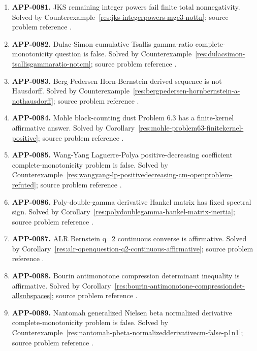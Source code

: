 \documentclass[11pt]{article}
\numberwithin{equation}{section}
\theoremstyle{definition}
\theoremstyle{remark}
\newcommand{\1}{\mathbf 1}
\begin{document}
\begin{enumerate}
\item \label{ledger:app-0081}\textbf{APP-0081.} JKS remaining integer powers fail finite total nonnegativity. Solved by Counterexample~\ref{res:jks-integerpowers-mge3-nottn}; source problem reference \cite{app-app-0065-source}.
\item \label{ledger:app-0082}\textbf{APP-0082.} Dulac-Simon cumulative Tsallis gamma-ratio complete-monotonicity question is false. Solved by Counterexample~\ref{res:dulacsimon-tsallisgammaratio-notcm}; source problem reference \cite{app-app-0082-source}.
\item \label{ledger:app-0083}\textbf{APP-0083.} Berg-Pedersen Horn-Bernstein derived sequence is not Hausdorff. Solved by Counterexample~\ref{res:bergpedersen-hornbernstein-a-nothausdorff}; source problem reference \cite{app-app-0083-source}.
\item \label{ledger:app-0084}\textbf{APP-0084.} Mohle block-counting dust Problem 6.3 has a finite-kernel affirmative answer. Solved by Corollary~\ref{res:mohle-problem63-finitekernel-positive}; source problem reference \cite{app-app-0084-source}.
\item \label{ledger:app-0085}\textbf{APP-0085.} Wang-Yang Laguerre-Polya positive-decreasing coefficient complete-monotonicity problem is false. Solved by Counterexample~\ref{res:wangyang-lp-positivedecreasing-cm-openproblem-refuted}; source problem reference \cite{app-app-0085-source}.
\item \label{ledger:app-0086}\textbf{APP-0086.} Poly-double-gamma derivative Hankel matrix has fixed spectral sign. Solved by Corollary~\ref{res:polydoublegamma-hankel-matrix-inertia}; source problem reference \cite{app-app-0086-source}.
\item \label{ledger:app-0087}\textbf{APP-0087.} ALR Bernstein q=2 continuous converse is affirmative. Solved by Corollary~\ref{res:alr-openquestion-q2-continuous-affirmative}; source problem reference \cite{app-app-0087-source}.
\item \label{ledger:app-0088}\textbf{APP-0088.} Bourin antimonotone compression determinant inequality is affirmative. Solved by Corollary~\ref{res:bourin-antimonotone-compressiondet-allsubspaces}; source problem reference \cite{app-app-0088-source}.
\item \label{ledger:app-0089}\textbf{APP-0089.} Nantomah generalized Nielsen beta normalized derivative complete-monotonicity problem is false. Solved by Counterexample~\ref{res:nantomah-pbeta-normalizedderivativecm-false-p1n1}; source problem reference \cite{app-app-0089-source}.

\end{enumerate}
\end{document}
